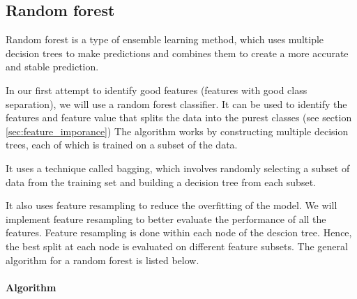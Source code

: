 \subsection{Random forest} \label{sec:method_random_forest} 
Random forest is a type of ensemble learning method, which uses multiple
decision trees to make predictions and combines them to create a more accurate
and stable prediction. 

In our first attempt to identify good features (features with good
class separation), we will use a random forest classifier. 
It can be used to identify the features and feature value that splits the data
into the purest classes (see section \ref{sec:feature_imporance})
The algorithm works by constructing multiple decision trees, each of which is trained 
on a subset of the data. 

It uses a technique called bagging, which involves
randomly selecting a subset of data from the training set and building a
decision tree from each subset. 

It also uses feature resampling to reduce the
overfitting of the model. We will implement feature resampling
to better evaluate the performance of all the features. Feature resampling is
done within each node of the descion tree. Hence, the best split at each node is
evaluated on different feature subsets. The general algorithm for a random
forest is listed below. 
\paragraph{Algorithm} 


